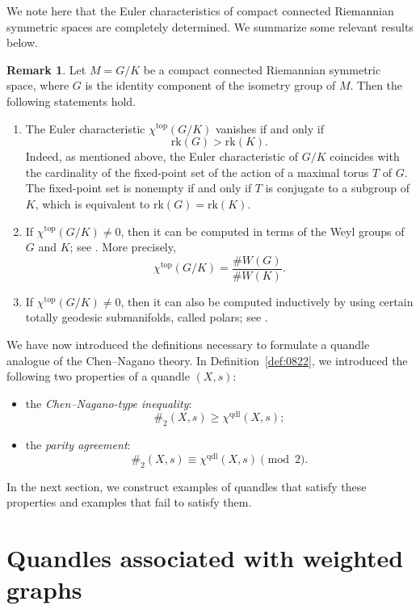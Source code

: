 \documentclass[12pt]{amsart}
\theoremstyle{definition}
\newtheorem{Rem}[Prop]{Remark}
\begin{document}
We note here that the Euler characteristics of compact connected Riemannian symmetric spaces are completely determined.
We summarize some relevant results below.

\begin{Rem}
Let $M=G/K$ be a compact connected Riemannian symmetric space, 
where $G$ is the identity component of the isometry group of $M$. 
Then the following statements hold. 
\begin{enumerate}
\item
The Euler characteristic $\chi^{\mathrm{top}}(G/K)$ vanishes if and only if
\[
\mathrm{rk}(G)>\mathrm{rk}(K).
\]
Indeed, as mentioned above, 
the Euler characteristic of $G/K$ coincides with the cardinality of the fixed-point set of the action of 
a maximal torus $T$ of $G$. 
The fixed-point set is nonempty if and only if $T$ is conjugate to a subgroup of $K$, which is equivalent to
$\mathrm{rk}(G)=\mathrm{rk}(K)$. 

\item
If $\chi^{\mathrm{top}}(G/K)\neq 0$, then it can be computed in terms of the Weyl groups of $G$ and $K$; see \cite{Wang}.
More precisely,
\[
\chi^{\mathrm{top}}(G/K)
=
\frac{\#W(G)}{\#W(K)}.
\]

\item
If $\chi^{\mathrm{top}}(G/K)\neq 0$, then it can also be computed inductively by using certain totally geodesic submanifolds, called polars; see \cite{Nagano}.
\end{enumerate}
\end{Rem}

We have now introduced the definitions necessary
to formulate a quandle analogue of the Chen--Nagano theory.
In Definition~\ref{def:0822},
we introduced the following two properties of a quandle $(X,s)$:
\begin{itemize}
\item
the \textit{Chen--Nagano-type inequality}:
\[
\#_2(X,s)\geq\chi^{\mathrm{qdl}}(X,s);
\]
\item
the \textit{parity agreement}:
\[
\#_2(X,s)
\equiv
\chi^{\mathrm{qdl}}(X,s)
\pmod{2}.
\]
\end{itemize}
In the next section, 
we construct examples of quandles that satisfy these properties and examples that fail to satisfy them. 

\section{Quandles associated with weighted graphs} 
\end{document}
